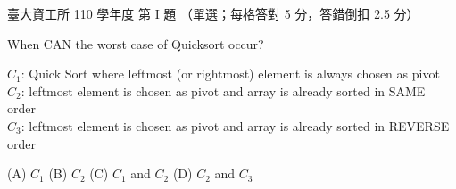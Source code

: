 \begin{pastexam}[label={px:ntu-110-dsaa-01}]{臺大資工所 110 學年度 第 I 題}
（單選；每格答對 5 分，答錯倒扣 2.5 分）

When CAN the worst case of Quicksort occur? \underline{}

$C_1$: Quick Sort where leftmost (or rightmost) element is always chosen as pivot\\
$C_2$: leftmost element is chosen as pivot and array is already sorted in SAME order\\
$C_3$: leftmost element is chosen as pivot and array is already sorted in REVERSE order

(A) $C_1$ \qquad (B) $C_2$ \qquad (C) $C_1$ and $C_2$ \qquad (D) $C_2$ and $C_3$
\end{pastexam}

